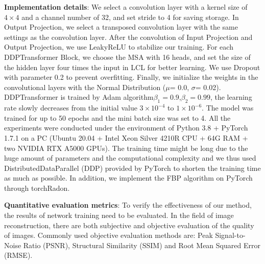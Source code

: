 \documentclass[lettersize,journal]{IEEEtran}
\begin{document}
\textbf{Implementation details}: We select a convolution layer with a kernel size of ${4}\times{4}$ and a channel number of 32, and set stride to 4 for saving storage. In Output Projection, we select a transposed convolution layer with the same settings as the convolution layer. After the convolution of Input Projection and Output Projection, we use LeakyReLU\cite{2013Rectifier} to stabilize our training. For each DDPTransformer Block, we choose the MSA with 16 heads, and set the size of the hidden layer four times the input in LCL for better learning. We use Dropout\cite{2014Dropout} with parameter 0.2 to prevent overfitting. Finally, we initialize the weights in the convolutional layers with the Normal Distribution ($\mu$= 0.0, $\sigma$= 0.02). DDPTransformer is trained by Adam algorithm\cite{2014Adam}$\beta_1=0.9$,$\beta_2=0.99$, the learning rate slowly decreases from the initial value $3\times10^{-4}$ to $1\times10^{-6}$. The model was trained for up to 50 epochs and the mini batch size was set to 4. All the experiments were conducted under the environment of Python 3.8 + PyTorch 1.7.1 on a PC (Ubuntu 20.04 + Intel Xeon Silver 4210R CPU + 64G RAM + two NVIDIA RTX A5000 GPUs). The training time might be long due to the huge amount of parameters and the computational complexity and we thus used DistributedDataParallel (DDP) provided by PyTorch to shorten the training time as much as possible. In addition, we implement the FBP algorithm on PyTorch through torchRadon\cite{torch_radon}.

\textbf{Quantitative evaluation metrics}: To verify the effectiveness of our method, the results of network training need to be evaluated. In the field of image reconstruction, there are both subjective and objective evaluation of the quality of images. Commonly used objective evaluation methods are: Peak Signal-to-Noise Ratio (PSNR), Structural Similarity (SSIM) and Root Mean Squared Error (RMSE).
\end{document}

